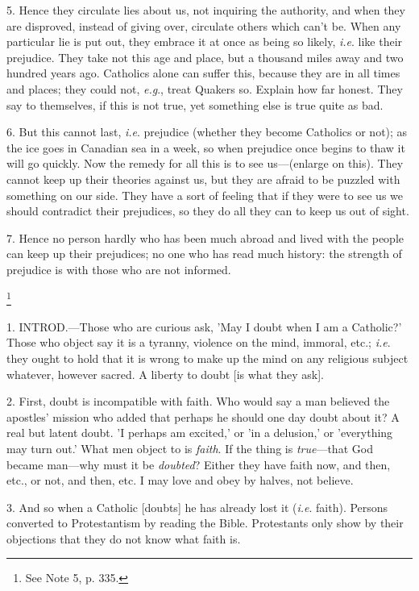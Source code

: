 5. Hence they circulate lies about us, not
inquiring the authority, and when they are disproved, instead of
giving over, circulate others which can't be. When any particular lie
is put out, they embrace it at once as being so likely, \emph{i.e}.
like their prejudice. They take not this age and place, but a
thousand miles away and two hundred years ago. Catholics alone can
suffer this, because they are in all times and places; they could not,
\emph{e.g}., treat Quakers so. Explain how far honest. They say to
themselves, if this is not true, yet something else is true quite as
bad.

6. But this cannot last, \emph{i.e}. prejudice
(whether they become Catholics or not); as the ice goes in Canadian
sea in a week, so when prejudice once begins to thaw it will go
quickly. Now the remedy for all this is to see us—(enlarge on this).
They cannot keep up their theories against us, but they are afraid to
be puzzled with something on our side. They have a sort of feeling
that if they were to see us we should contradict their prejudices, so
they do all they can to keep us out of sight.

7. Hence no person hardly who has been much
abroad and lived with the people can keep up their prejudices; no one
who has read much history: the strength of prejudice is with those who
are not informed.


\footnote{See Note
5, p. 335.}

1. INTROD.—Those
who are curious ask, 'May I doubt when I am a Catholic?' Those who
object say it is a tyranny, violence on the mind, immoral, etc.; \emph{i.e}.
they ought to hold that it is wrong to make up the mind on any
religious subject whatever, however sacred. A liberty to doubt [is
what they ask].

2. First, doubt is incompatible with faith. Who
would say a man believed the apostles' mission who added that perhaps
he should one day doubt about it? A real but latent doubt. 'I perhaps
am excited,' or 'in a delusion,' or 'everything may turn out.' What
men object to is \emph{faith}. If the thing is \emph{true}—that God
became man—why must it be \emph{doubted}? Either they have faith
now, and then, etc., or not, and then, etc. I may love and obey by
halves, not believe.

3. And so when a Catholic [doubts] he has already
lost it (\emph{i.e}. faith). Persons converted to Protestantism by
reading the Bible. Protestants only show by their objections that they
do not know what faith is.

